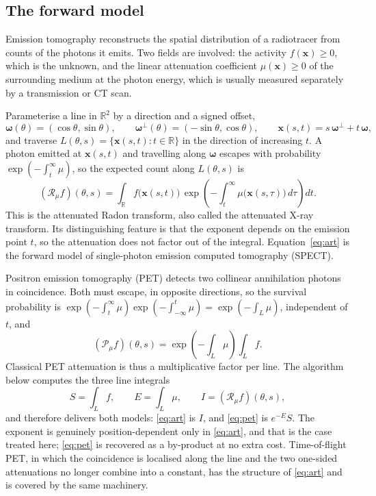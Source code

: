 \documentclass[11pt]{article}
\newcommand{\bx}{\mathbf{x}}
\newcommand{\om}{\boldsymbol{\omega}}
\newcommand{\omp}{\om^{\perp}}
\newcommand{\Rmu}{\mathcal{R}_{\mu}}
\begin{document}
\subsection{The forward model}

Emission tomography reconstructs the spatial distribution of a radiotracer
from counts of the photons it emits. Two fields are involved: the activity
$f(\bx)\ge 0$, which is the unknown, and the linear attenuation coefficient
$\mu(\bx)\ge 0$ of the surrounding medium at the photon energy, which is
usually measured separately by a transmission or CT scan.

Parameterise a line in $\mathbb{R}^2$ by a direction and a signed offset,
\begin{equation}
  \om(\theta)=(\cos\theta,\sin\theta),\qquad
  \omp(\theta)=(-\sin\theta,\cos\theta),\qquad
  \bx(s,t)=s\,\omp+t\,\om ,
\end{equation}
and traverse $L(\theta,s)=\{\bx(s,t):t\in\mathbb{R}\}$ in the direction of
increasing $t$. A photon emitted at $\bx(s,t)$ and travelling along $\om$
escapes with probability $\exp(-\int_t^{\infty}\mu)$, so the expected count
along $L(\theta,s)$ is
\begin{equation}
  (\Rmu f)(\theta,s)
  = \int_{\mathbb{R}} f\big(\bx(s,t)\big)\,
    \exp\!\left(-\int_t^{\infty}\mu\big(\bx(s,\tau)\big)\,d\tau\right) dt .
  \label{eq:art}
\end{equation}
This is the attenuated Radon transform, also called the attenuated X-ray
transform. Its distinguishing feature is that the exponent depends on the
emission point $t$, so the attenuation does not factor out of the integral.
Equation~\eqref{eq:art} is the forward model of single-photon emission
computed tomography (SPECT).

Positron emission tomography (PET) detects two collinear annihilation photons
in coincidence. Both must escape, in opposite directions, so the survival
probability is $\exp(-\int_t^{\infty}\mu)\exp(-\int_{-\infty}^{t}\mu)
=\exp(-\int_L\mu)$, independent of $t$, and
\begin{equation}
  (\mathcal{P}_{\mu}f)(\theta,s)
  = \exp\!\left(-\int_L \mu\right)\int_L f .
  \label{eq:pet}
\end{equation}
Classical PET attenuation is thus a multiplicative factor per line. The
algorithm below computes the three line integrals
\begin{equation}
  S=\int_L f,\qquad E=\int_L\mu,\qquad I=(\Rmu f)(\theta,s),
  \label{eq:three}
\end{equation}
and therefore delivers both models: \eqref{eq:art} is $I$, and \eqref{eq:pet}
is $e^{-E}S$. The exponent is genuinely position-dependent only in
\eqref{eq:art}, and that is the case treated here; \eqref{eq:pet} is recovered
as a by-product at no extra cost. Time-of-flight PET, in which the coincidence
is localised along the line and the two one-sided attenuations no longer
combine into a constant, has the structure of \eqref{eq:art} and is covered by
the same machinery.
\end{document}
